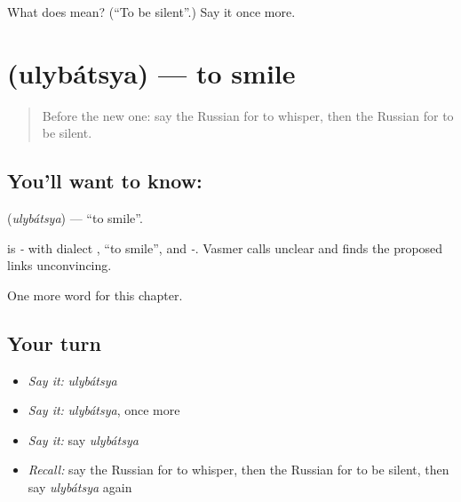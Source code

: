 \begin{tcolorbox}[breakable,colback=teal!4,colframe=teal!35!black,title={Before you move on}]
What does  mean? (\textquotedblleft{}To be silent\textquotedblright{}.) Say it once more.
\end{tcolorbox}
\section[\texorpdfstring{\ru{улыбаться} (ulybátsya)}{улыбаться (ulybátsya)}]{ (ulybátsya) — to smile}

\label{lesson:RU-C235-ulybatsya}



\begin{quote}
Before the new one: say the Russian for to whisper, then the Russian for to be silent.
\end{quote}

\subsection*{You'll want to know: }
\textbf{} (\emph{ulybátsya}) — \textquotedblleft{}to smile\textquotedblright{}.

\begin{cousinweb}
\textbf{} is \emph{-} with dialect \emph{}, \textquotedblleft{}to smile\textquotedblright{}, and \emph{-}. Vasmer calls \emph{} unclear and finds the proposed links unconvincing.
\end{cousinweb}

\begin{grammarlens}[title={What you've built}]
One more word for this chapter.
\end{grammarlens}

\subsection*{Your turn}
\begin{itemize}
\raggedright
  \item \emph{Say it:} \emph{ulybátsya}
  \item \emph{Say it:} \emph{ulybátsya}, once more
  \item \emph{Say it:} say \emph{ulybátsya}
  \item \emph{Recall:} say the Russian for to whisper, then the Russian for to be silent, then say \emph{ulybátsya} again
\end{itemize}


